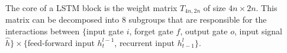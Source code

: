 The core of a LSTM block is the weight matrix $T_{4n,2n}$ of size $4n \times
2n$. This matrix can be decomposed into 8 subgroups that are responsible for the
interactions between $\{$input gate $i$, forget gate $f$, output gate $o$,
input signal $\hat{h}\} \times \{$feed-forward input $h_t^{l-1}$, recurrent
input $h_{t-1}^l\}$.

%

